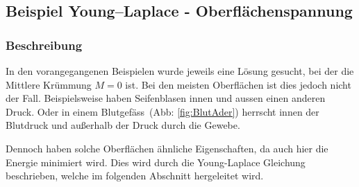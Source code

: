 \begin{refsection}
\subsection{Beispiel Young–Laplace - Oberflächenspannung}
\label{Young-Laplace}
\subsubsection{Beschreibung}
\label{YL-Beschreibung}
In den vorangegangenen Beispielen wurde jeweils eine Lösung gesucht, bei der die Mittlere Krümmung $M=0$ ist. Bei den meisten Oberflächen ist dies jedoch nicht der Fall. Beispielsweise haben Seifenblasen innen und aussen einen anderen Druck. Oder in einem Blutgefäss \,(Abb: \ref{fig:BlutAder}) herrscht innen der Blutdruck und außerhalb der Druck durch die Gewebe.

Dennoch haben solche Oberflächen ähnliche Eigenschaften, da auch hier die Energie minimiert wird. Dies wird durch die Young-Laplace Gleichung beschrieben, welche im folgenden Abschnitt hergeleitet wird.

\end{refsection}
